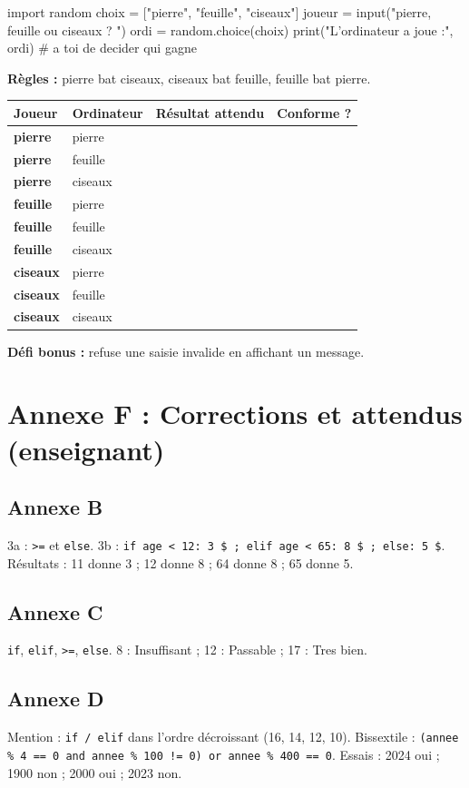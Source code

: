 \documentclass[11pt,a4paper]{article}
\begin{document}
\begin{python}
import random
choix = ["pierre", "feuille", "ciseaux"]
joueur = input("pierre, feuille ou ciseaux ? ")
ordi = random.choice(choix)
print("L'ordinateur a joue :", ordi)
# a toi de decider qui gagne
\end{python}

\textbf{Règles :} pierre bat ciseaux, ciseaux bat feuille, feuille bat pierre.

\begin{tabularx}{\linewidth}{>{\bfseries}p{2.4cm}Y Y Y}
\toprule
Joueur & Ordinateur & Résultat attendu & Conforme ?\\
\midrule
pierre & pierre & & \\ pierre & feuille & & \\ pierre & ciseaux & & \\
feuille & pierre & & \\ feuille & feuille & & \\ feuille & ciseaux & & \\
ciseaux & pierre & & \\ ciseaux & feuille & & \\ ciseaux & ciseaux & & \\
\bottomrule
\end{tabularx}

\textbf{Défi bonus :} refuse une saisie invalide en affichant un message.

\newpage
\section*{Annexe F : Corrections et attendus (enseignant)}

\subsection*{Annexe B}
3a : \texttt{>=} et \texttt{else}. 3b : \texttt{if age < 12: 3 \$ ; elif age < 65: 8 \$ ; else: 5 \$}. Résultats : 11 donne 3 ; 12 donne 8 ; 64 donne 8 ; 65 donne 5.

\subsection*{Annexe C}
\texttt{if}, \texttt{elif}, \texttt{>=}, \texttt{else}. 8 : Insuffisant ; 12 : Passable ; 17 : Tres bien.

\subsection*{Annexe D}
Mention : \texttt{if / elif} dans l'ordre décroissant (16, 14, 12, 10). Bissextile : \texttt{(annee \% 4 == 0 and annee \% 100 != 0) or annee \% 400 == 0}. Essais : 2024 oui ; 1900 non ; 2000 oui ; 2023 non.
\end{document}
